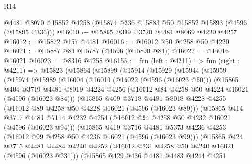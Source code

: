 \begin{lexlean}{R14}
\begin{coremodule}
    @4481
    @8070
    @15852
    @4258
    (@15874 @336 @15883 @50 @15852 @15893 (@4596 (@15895 @336)))
@16010 := @15865 @399 @3720 @4481 @8069 @4220 @4257
@16012 := @15872 @157 @4481
@16016 := @16012 @50 @4258 @50 @4220
@16021 := @15887 @84 @15787 (@4596 (@15890 @84))
@16022 := @16016 @16021
@16023 := @8316 @4258
@16155 := fun (left : @4211) =>
  fun (right : @4211) =>
  @15823
    (@15864
      (@15899
        (@15914
          (@15929
            (@15944
              (@15959
                (@15974
                  (@15989
                    (@16004
                      (@16010
                        (@16022 (@4596 (@16023 @50)))
                        (@15865
                          @404
                          @3719
                          @4481
                          @8019
                          @4224
                          @4256
                          (@16012 @84 @4258 @50 @4224 @16021 (@4596 (@16023 @84)))
                          (@15865
                            @409
                            @3718
                            @4481
                            @8018
                            @4228
                            @4255
                            (@16012 @89 @4258 @50 @4228 @16021 (@4596 (@16023 @89)))
                            (@15865
                              @414
                              @3717
                              @4481
                              @7114
                              @4232
                              @4254
                              (@16012 @94 @4258 @50 @4232 @16021 (@4596 (@16023 @94)))
                              (@15865
                                @419
                                @3716
                                @4481
                                @5373
                                @4236
                                @4253
                                (@16012 @99 @4258 @50 @4236 @16021 (@4596 (@16023 @99)))
                                (@15865
                                  @424
                                  @3715
                                  @4481
                                  @4484
                                  @4240
                                  @4252
                                  (@16012 @231 @4258 @50 @4240 @16021 (@4596 (@16023 @231)))
                                  (@15865
                                    @429
                                    @436
                                    @4481
                                    @4483
                                    @4244
                                    @4251

\end{coremodule}
\end{lexlean}

